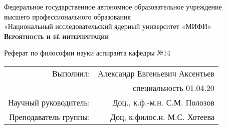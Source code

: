 
\begin{titlepage}
	\begin{center}
		
		{Федеральное государственное автономное образовательное учреждение\\			
			высшего профессионального образования\\		
			«Национальный исследовательский ядерный университет «МИФИ»} \\[2.4cm]
		
		
		
		\textsc{\textbf{Вероятность и её интерпретации} \\[2.4cm] }
		
		
	\end{center}
	
	
	\begin{flushright}
		Реферат по философии науки аспиранта кафедры №14
		\begin{tabular}{rr}
			Выполнил: & Александр Евгеньевич Аксентьев \\
			&	специальность 01.04.20 \\					
			Научный руководитель: \underline{\hspace*{3cm}} & Доц., к.ф.-м.н.  С.М. Полозов 	\\
			Преподаватель группы: \underline{\hspace*{3cm}} & Доц, к.филос.н. М.С. Хотеева
		\end{tabular}
		
	\end{flushright}
	
	\vfill
	
	
	\begin{center}
		\the\year{}
	\end{center}
	
	
	
\end{titlepage}